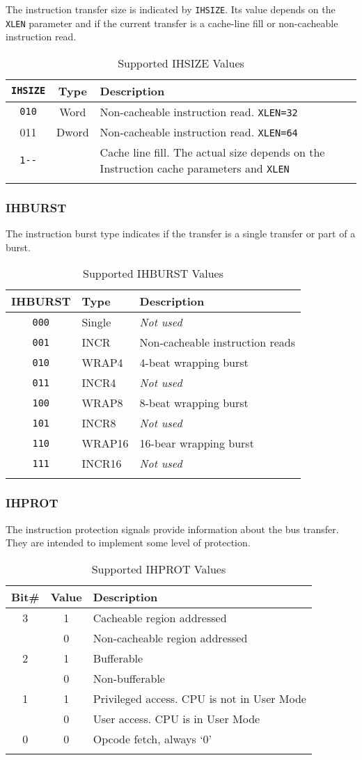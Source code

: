 The instruction transfer size is indicated by \texttt{IHSIZE}. Its value depends
on the \texttt{XLEN} parameter and if the current transfer is a cache-line fill
or non-cacheable instruction read.

\begin{longtable}[]{@{}ccp{7cm}@{}}
\toprule
\texttt{IHSIZE} & Type & Description\tabularnewline
\midrule
\endhead
\texttt{010} & Word & Non-cacheable instruction read. \texttt{XLEN=32}\tabularnewline
011 & Dword & Non-cacheable instruction read. \texttt{XLEN=64}\tabularnewline
\texttt{1-\/-} & & Cache line fill. The actual size depends on the Instruction
cache parameters and \texttt{XLEN}\tabularnewline
\bottomrule
\caption{Supported IHSIZE Values}
\label{tab:isize-values}
\end{longtable}

\subsubsection{IHBURST}\label{ihburst}

The instruction burst type indicates if the transfer is a single
transfer or part of a burst.

\begin{longtable}[]{@{}cll@{}}
\toprule
IHBURST & Type & Description\tabularnewline
\midrule
\endhead
\texttt{000} & Single & \emph{Not used}\tabularnewline
\texttt{001} & INCR & Non-cacheable instruction reads\tabularnewline
\texttt{010} & WRAP4 & 4-beat wrapping burst\tabularnewline
\texttt{011} & INCR4 & \emph{Not used}\tabularnewline
\texttt{100} & WRAP8 & 8-beat wrapping burst\tabularnewline
\texttt{101} & INCR8 & \emph{Not used}\tabularnewline
\texttt{110} & WRAP16 & 16-bear wrapping burst\tabularnewline
\texttt{111} & INCR16 & \emph{Not used}\tabularnewline
\bottomrule
\caption{Supported IHBURST Values}
\label{tab:ihburst-values}
\end{longtable}

\subsubsection{IHPROT}\label{ihprot}

The instruction protection signals provide information about the bus
transfer. They are intended to implement some level of protection.

\begin{longtable}[]{@{}ccl@{}}
\toprule
Bit\# & Value & Description\tabularnewline
\midrule
\endhead
3 & 1 & Cacheable region addressed\tabularnewline
& 0 & Non-cacheable region addressed\tabularnewline
2 & 1 & Bufferable\tabularnewline
& 0 & Non-bufferable\tabularnewline
1 & 1 & Privileged access. CPU is not in User Mode\tabularnewline
& 0 & User access. CPU is in User Mode\tabularnewline
0 & 0 & Opcode fetch, always `0'\tabularnewline
\bottomrule
\caption{Supported IHPROT Values}
\label{tab:ihprot-values}
\end{longtable}


